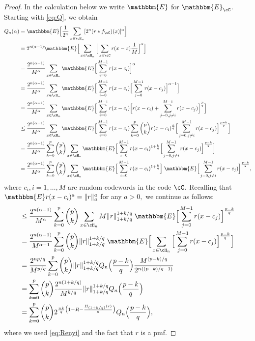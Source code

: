 \documentclass{amsart}
\theoremstyle{remark}
\begin{document}
\begin{proof} 
In the calculation below we write $\mathbbm{E}$ for $\mathbbm{E}_\cC$. Starting with \eqref{eq:Q}, we obtain
\begin{align*}
     Q_n(\alpha) 
     & = \mathbbm{E}\Big[\frac{1}{2^n}\sum_{x \in \cH_n} [2^n(r \ast f_\cC)(x)]^{\alpha}\Big]\\
     & = 2^{n(\alpha-1)}\mathbbm{E}\Big[\sum_{x \in \cH_n} \Big[\sum_{z \in \cC}r(x-z)\frac{1}{M}\Big]^{\alpha}\Big]\\
     & = \frac{2^{n(\alpha-1)}}{M^{\alpha}}\sum_{x \in \cH_n} \mathbbm{E}\Big[\sum_{i = 0}^{M-1}r(x-c_i)\Big]^{\alpha}\\
     & = \frac{2^{n(\alpha-1)}}{M^{\alpha}}\sum_{x \in \cH_n} \mathbbm{E}\Big[\sum_{i = 0}^{M-1}r(x-c_i)\Big[\sum_{j = 0}^{M-1}r(x-c_j)\Big]^{\alpha-1}\Big]\\
     & = \frac{2^{n(\alpha-1)}}{M^{\alpha}}\sum_{x \in \cH_n} \mathbbm{E}\Big[\sum_{i = 0}^{M-1}r(x-c_i)\Big[r(x-c_i) + \sum_{j = 0, j\neq i}^{M-1}r(x-c_j)\Big]^{\frac{p}{q}}\Big]\\
     & \leq \frac{2^{n(\alpha-1)}}{M^{\alpha}}\sum_{x \in \cH_n} \mathbbm{E}\Big[\sum_{i = 0}^{M-1}r(x-c_i)\sum_{k=0}^p \binom{p}{k} r(x-c_i)^\frac{k}{q} \Big[\sum_{j = 0, j\neq i}^{M-1}r(x-c_j)\Big]^\frac{p-k}{q}\Big]\\
     & = \frac{2^{n(\alpha-1)}}{M^{\alpha}}\sum_{k=0}^p \binom{p}{k}\sum_{x \in \cH_n} \mathbbm{E}\Big[ \sum_{i = 0}^{M-1}r(x-c_i)^{1+\frac{k}{q}} \Big[\sum_{j = 0, j\neq i}^{M-1}r(x-c_j)\Big]^\frac{p-k}{q}\Big]\\
     & = \frac{2^{n(\alpha-1)}}{M^{\alpha}}\sum_{k=0}^p \binom{p}{k}\sum_{x \in \cH_n} \mathbbm{E}\Big[ \sum_{i = 0}^{M-1}r(x-c_i)^{1+\frac{k}{q}}\Big] \;\mathbbm{E}\Big[\sum_{j = 0, j\neq i}^{M-1}r(x-c_j)\Big]^\frac{p-k}{q},
\end{align*}
where $c_i,i=1,\dots,M$ are random codewords in the code $\cC.$ Recalling that $\mathbbm{E} r(x-c_i)^{a} =  \|r\|_a^a$ for any $a>0,$ we continue as follows:
\begin{align*} 
     & \leq \frac{2^{n(\alpha-1)}}{M^{\alpha}}\sum_{k=0}^p \binom{p}{k}\sum_{x \in \cH_n} M\|r\|_{1+k/q}^{1+k/q}\; \mathbbm{E}\Big[\sum_{j = 0}^{M-1}r(x-c_j)\Big]^\frac{p-k}{q}\\
     & = \frac{2^{n(\alpha-1)}}{M^{\alpha-1}}\sum_{k=0}^p \binom{p}{k} \|r\|_{1+k/q}^{1+k/q} \; \mathbbm{E}\Big[\sum_{x \in \cH_n}\Big[\sum_{j = 0}^{M-1}r(x-c_j)\Big]^\frac{p-k}{q}\Big]\\
     & = \frac{2^{np/q}}{M^{p/q}}\sum_{k=0}^p \binom{p}{k} \|r\|_{1+k/q}^{1+k/q} Q_n\Big(\frac{p-k}{q}\Big)\frac{M^{(p-k)/q}}{2^{n((p-k)/q -1)}}\\
     & = \sum_{k=0}^p \binom{p}{k} \frac{2^{n(1+k/q)}}{M^{k/q}} \|r\|_{1+k/q}^{1+k/q}Q_n\Big(\frac{p-k}{q}\Big)\\
     & = \sum_{k=0}^p \binom{p}{k} 2^{\frac{nk}{q}\big(1-R-\frac{H_{(1+k/q)}(r)}{n}\big)}Q_n\Big(\frac{p-k}{q}\Big),
\end{align*}
where we used \eqref{eq:Renyi} and the fact that $r$ is a pmf.
\end{proof}
\end{document}
